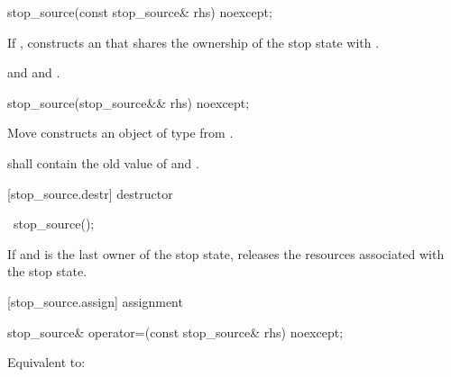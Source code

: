 {%
\begin{itemdecl}
stop_source(const stop_source& rhs) noexcept;
\end{itemdecl}
\begin{itemdescr}
  \pnum\effects If ,
                constructs an 
                that shares the ownership of the stop state with .

  \pnum\postconditions {}
                and 
                and .
\end{itemdescr}

%
\begin{itemdecl}
stop_source(stop_source&& rhs) noexcept;
\end{itemdecl}
\begin{itemdescr}
  \pnum\effects Move constructs an object of type  from .

  \pnum\postconditions {} shall contain the old value of  and
                        .
\end{itemdescr}

[stop_source.destr]{ destructor}

%
\begin{itemdecl}
~stop_source();
\end{itemdecl}

\begin{itemdescr}
 \pnum\effects If  and  is the last owner of the stop state,
                releases the resources associated with the stop state.
\end{itemdescr}

[stop_source.assign]{ assignment}

%
\begin{itemdecl}
stop_source& operator=(const stop_source& rhs) noexcept;
\end{itemdecl}
\begin{itemdescr}
  \pnum\effects Equivalent to: 


\end{itemdescr}}
